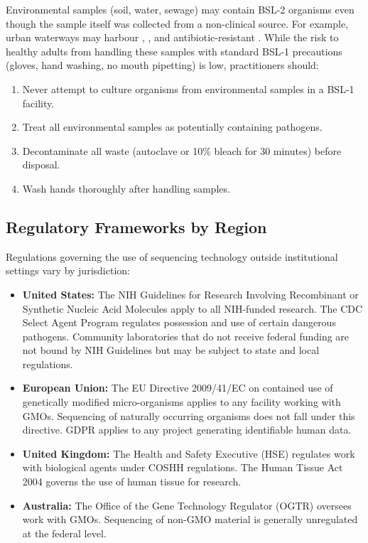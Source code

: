 \begin{warningbox}[title={Environmental Samples May Contain Pathogens}]
Environmental samples (soil, water, sewage) may contain BSL-2 organisms even though the sample itself was collected from a non-clinical source. For example, urban waterways may harbour , , and antibiotic-resistant . While the risk to healthy adults from handling these samples with standard BSL-1 precautions (gloves, hand washing, no mouth pipetting) is low, practitioners should:
\begin{enumerate}[nosep]
  \item Never attempt to culture organisms from environmental samples in a BSL-1 facility.
  \item Treat all environmental samples as potentially containing pathogens.
  \item Decontaminate all waste (autoclave or 10\% bleach for 30 minutes) before disposal.
  \item Wash hands thoroughly after handling samples.
\end{enumerate}
\end{warningbox}

\subsection{Regulatory Frameworks by Region}
\label{subsec:accessible:regulation}

Regulations governing the use of sequencing technology outside institutional settings vary by jurisdiction:

\begin{itemize}[itemsep=2pt]
  \item \textbf{United States:} The NIH Guidelines for Research Involving Recombinant or Synthetic Nucleic Acid Molecules apply to all NIH-funded research. The CDC Select Agent Program regulates possession and use of certain dangerous pathogens. Community laboratories that do not receive federal funding are not bound by NIH Guidelines but may be subject to state and local regulations.
  \item \textbf{European Union:} The EU Directive 2009/41/EC on contained use of genetically modified micro-organisms applies to any facility working with GMOs. Sequencing of naturally occurring organisms does not fall under this directive. GDPR applies to any project generating identifiable human data.
  \item \textbf{United Kingdom:} The Health and Safety Executive (HSE) regulates work with biological agents under COSHH regulations. The Human Tissue Act 2004 governs the use of human tissue for research.
  \item \textbf{Australia:} The Office of the Gene Technology Regulator (OGTR) oversees work with GMOs. Sequencing of non-GMO material is generally unregulated at the federal level.
\end{itemize}

